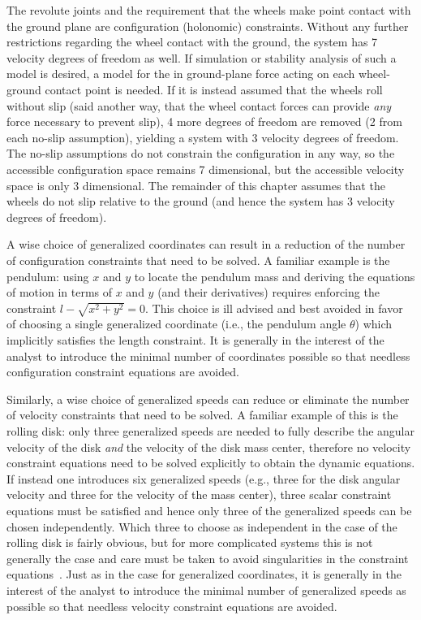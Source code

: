The revolute joints and the requirement that the wheels make point contact with
the ground plane are configuration (holonomic) constraints. Without any further
restrictions regarding the wheel contact with the ground, the system has 7
velocity degrees of freedom as well. If simulation or stability analysis of
such a model is desired, a model for the in ground-plane force acting on each
wheel-ground contact point is needed. If it is instead assumed that the wheels
roll without slip (said another way, that the wheel contact forces can provide
\textit{any} force necessary to prevent slip), 4 more degrees of freedom are
removed (2 from each no-slip assumption), yielding a system with 3 velocity
degrees of freedom. The no-slip assumptions do not constrain the configuration
in any way, so the accessible configuration space remains 7 dimensional, but
the accessible velocity space is only 3 dimensional.  The remainder of this
chapter assumes that the wheels do not slip relative to the ground (and hence
the system has 3 velocity degrees of freedom).

A wise choice of generalized coordinates can result in a reduction of the
number of configuration constraints that need to be solved. A familiar example
is the pendulum: using $x$ and $y$ to locate the pendulum mass and deriving the
equations of motion in terms of $x$ and $y$ (and their derivatives) requires
enforcing the constraint $l - \sqrt{x^2 + y^2} = 0$. This choice is ill advised
and best avoided in favor of choosing a single generalized coordinate (i.e.,
the pendulum angle $\theta$) which implicitly satisfies the length constraint.
It is generally in the interest of the analyst to introduce the minimal
number of coordinates possible so that needless configuration constraint
equations are avoided.

Similarly, a wise choice of generalized speeds can reduce or eliminate the
number of velocity constraints that need to be solved. A familiar example of
this is the rolling disk: only three generalized speeds are needed to fully
describe the angular velocity of the disk \textit{and} the velocity of the disk
mass center, therefore no velocity constraint equations need to be solved
explicitly to obtain the dynamic equations. If instead one introduces six
generalized speeds (e.g., three for the disk angular velocity and three for the
velocity of the mass center), three scalar constraint equations must be
satisfied and hence only three of the generalized speeds can be chosen
independently. Which three to choose as independent in the case of the rolling
disk is fairly obvious, but for more complicated systems this is not generally
the case and care must be taken to avoid singularities in the constraint
equations~\cite{Reckdahl1996}. Just as in the case for generalized coordinates,
it is generally in the interest of the analyst to introduce the minimal number
of generalized speeds as possible so that needless velocity constraint
equations are avoided.

